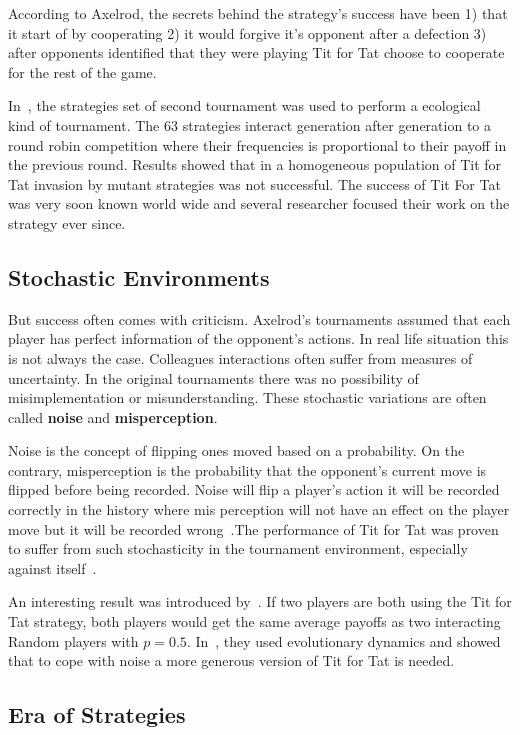 \documentclass{article}
\begin{document}
According to Axelrod, the secrets behind the strategy's success have been
1) that it start of by cooperating 2) it would forgive it's opponent after a
defection 3) after opponents identified that they were playing Tit for Tat choose 
to cooperate for the rest of the game. 

In~\cite{Axelrod1981}, the strategies set of second tournament was used
to perform a ecological kind of tournament. The 63 strategies interact generation
after generation to a round robin competition where their frequencies is proportional
to their payoff in the previous round. Results showed that in a homogeneous
population of Tit for Tat invasion by mutant strategies was not successful. 
The success of Tit For Tat was very soon  known world wide and several researcher
focused their work on the strategy ever since.%

\subsection{Stochastic Environments}
But success often comes with criticism. Axelrod's tournaments assumed that
each player has perfect information of the opponent's actions. In real life 
situation this is not always the case. Colleagues interactions 
often suffer from measures of uncertainty. In the original tournaments
there was no possibility of misimplementation or misunderstanding. These
stochastic variations are often called \textbf{noise} and \textbf{misperception}.

Noise is the concept of flipping ones moved based on a probability. On the
contrary, misperception is the probability that the opponent’s current move is 
flipped before being recorded. Noise will flip a player’s action it will be recorded 
correctly in the history where mis perception will not have an effect on the player 
move but it will be recorded wrong~\cite{Hoffmann1998}.The performance of
Tit for Tat was proven to suffer from such stochasticity in the tournament 
environment, especially against itself~\cite{Bendor1991,Godfray1992, 
Molander1985, Nowak1992}.

An interesting result was introduced by~\cite{Molander1985}.  If two players are
both using the Tit for Tat strategy, both players would get the same average
payoffs as two interacting Random players with \(p=0.5\). 
In~\cite{Nowak1992}, they used evolutionary dynamics and showed that to cope
with noise a more generous version of Tit for Tat is needed.  

\subsection{Era of Strategies}
\end{document}
